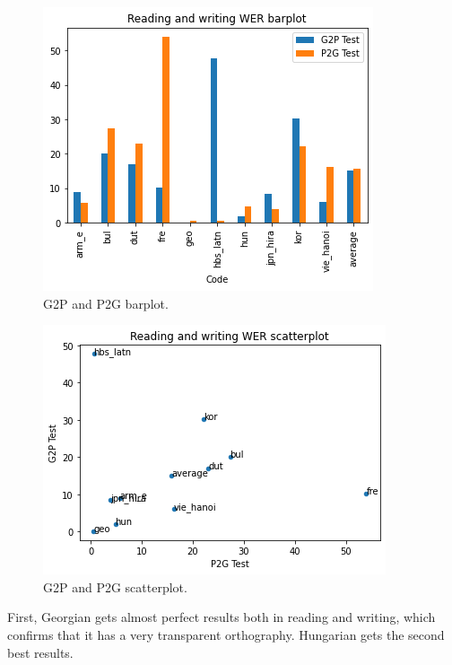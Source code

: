 \documentclass[11pt,a4paper]{article}
\begin{document}
\begin{figure}[ht]
    \centering
    \includegraphics[width=\linewidth]{g2p_p2g_barplot.png}
    \caption{G2P and P2G barplot.}
    \label{fig:g2p_p2g_barplot}
\end{figure}

\begin{figure}[ht]
    \centering
    \includegraphics[width=\linewidth]{g2p_p2g_scatterplot.png}
    \caption{G2P and P2G scatterplot.}
    \label{fig:g2p_p2g_scatterplot}
\end{figure}

First, Georgian gets almost perfect results both in reading and writing, which confirms that it has a very transparent orthography. Hungarian gets the second best results.
\end{document}
